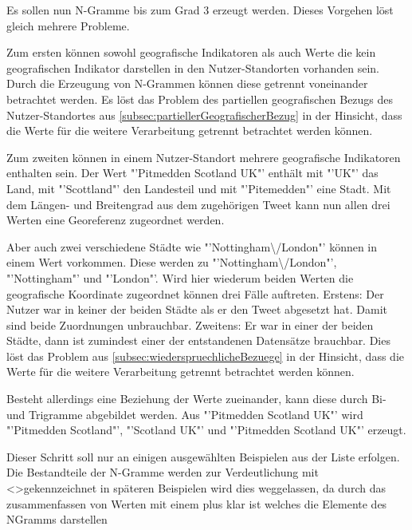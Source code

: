 				Es sollen nun N-Gramme bis zum Grad 3 erzeugt werden. 
				Dieses Vorgehen löst gleich mehrere Probleme.

				Zum ersten können sowohl geografische Indikatoren als auch Werte die kein geografischen Indikator darstellen in den Nutzer-Standorten vorhanden sein.
				Durch die Erzeugung von N-Grammen können diese getrennt voneinander betrachtet werden.
				Es löst das Problem des partiellen geografischen Bezugs des Nutzer-Standortes aus \ref{subsec:partiellerGeografischerBezug} in der Hinsicht, dass die Werte für die weitere Verarbeitung getrennt betrachtet werden können.

				Zum zweiten können in einem Nutzer-Standort mehrere geografische Indikatoren enthalten sein.  
				Der Wert "'Pitmedden Scotland UK"' enthält mit "'UK"' das Land, mit "'Scottland"' den Landesteil und mit "'Pitemedden"' eine Stadt. 
				Mit dem Längen- und Breitengrad aus dem zugehörigen Tweet kann nun allen drei Werten eine Georeferenz zugeordnet werden.

				Aber auch zwei verschiedene Städte wie "'Nottingham\textbackslash/London"' können in einem Wert vorkommen.
				Diese werden zu "'Nottingham\textbackslash/London"', "'Nottingham"' und "'London"'.
				Wird hier wiederum beiden Werten die geografische Koordinate zugeordnet können drei Fälle auftreten.
				Erstens: Der Nutzer war in keiner der beiden Städte als er den Tweet abgesetzt hat. 
				Damit sind beide Zuordnungen unbrauchbar.
				Zweitens: Er war in einer der beiden Städte, dann ist zumindest einer der entstandenen Datensätze brauchbar.
				Dies löst das Problem aus \ref{subsec:wiederspruechlicheBezuege} in der Hinsicht, dass die Werte für die weitere Verarbeitung getrennt betrachtet werden können.

				Besteht allerdings eine Beziehung der Werte zueinander, kann diese durch Bi- und Trigramme abgebildet werden.
				Aus "'Pitmedden Scotland UK"' wird "'Pitmedden Scotland"', "'Scotland UK"' und "'Pitmedden Scotland UK"' erzeugt.

				Dieser Schritt soll nur an einigen ausgewählten Beispielen aus der Liste erfolgen.
				Die Bestandteile der N-Gramme werden zur Verdeutlichung mit \textless \textgreater gekennzeichnet in späteren Beispielen wird dies weggelassen, da durch das zusammenfassen von Werten mit einem plus klar ist welches die Elemente des NGramms darstellen

